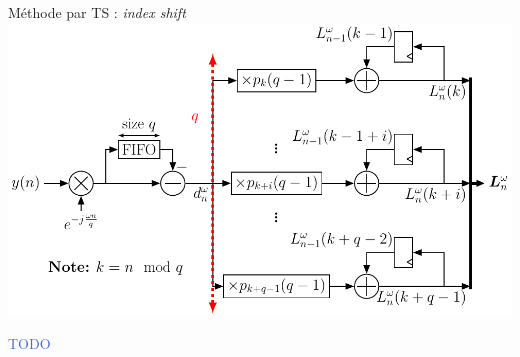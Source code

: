 \documentclass[../main.tex]{subfiles}
\begin{document}
\begin{frame}{Méthode par TS : \textit{index shift}}
  \centering
  \includegraphics[width=\linewidth, height=.71\textheight, keepaspectratio=true]{figures/tikzpicture/arch_subts_sync_stdl.pdf}
  \begin{center}
    \textcolor{RoyalBlue}{TODO}
  \end{center}
\end{frame}
\end{document}

